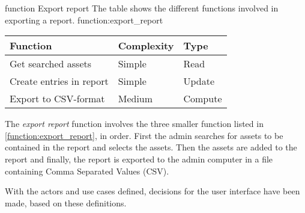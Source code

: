 \fancyLayout
    {function}
    {Export report}
    {The table shows the different functions involved in exporting a report.}
    {function:export_report}
    {
        \centering
        \begin{tabular}{|l|l|l|}
            \hline
            \textbf{Function} & \textbf{Complexity} & \textbf{Type}\\
            \hline
            \hline
            Get searched assets & Simple & Read \\
            \hline
            Create entries in report & Simple & Update \\
            \hline
            Export to CSV-format & Medium & Compute \\
            \hline
        \end{tabular}
}

The \textit{export report} function involves the three smaller function listed in \autoref{function:export_report}, in order. First the admin searches for assets to be contained in the report and selects the assets. Then the assets are added to the report and finally, the report is exported to the admin computer in a file containing Comma Separated Values (CSV).
\par
With the actors and use cases defined, decisions for the user interface have been made, based on these definitions.